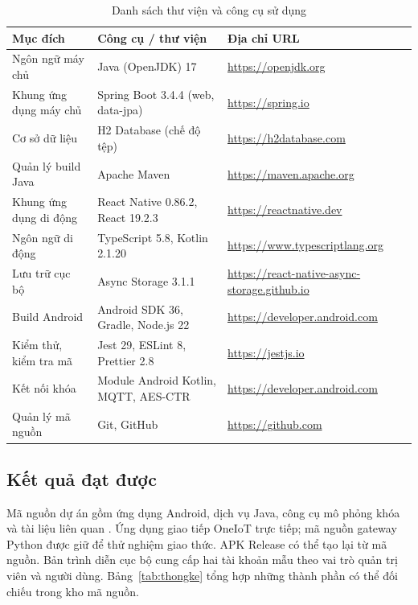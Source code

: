 \documentclass[../DoAn.tex]{subfiles}
\begin{document}
\begin{table}[H]
\centering\small
\renewcommand{\arraystretch}{1.1}
\caption{Danh sách thư viện và công cụ sử dụng}
\label{table:congcu}
\begin{tabularx}{\textwidth}{|p{4.3cm}|p{4.6cm}|X|}
\hline
\textbf{Mục đích} & \textbf{Công cụ / thư viện} & \textbf{Địa chỉ URL} \\ \hline
Ngôn ngữ máy chủ & Java (OpenJDK) 17 & \url{https://openjdk.org} \\ \hline
Khung ứng dụng máy chủ & Spring Boot 3.4.4 (web, data-jpa) & \url{https://spring.io} \\ \hline
Cơ sở dữ liệu & H2 Database (chế độ tệp) & \url{https://h2database.com} \\ \hline
Quản lý build Java & Apache Maven & \url{https://maven.apache.org} \\ \hline
Khung ứng dụng di động & React Native 0.86.2, React 19.2.3 & \url{https://reactnative.dev} \\ \hline
Ngôn ngữ di động & TypeScript 5.8, Kotlin 2.1.20 & \url{https://www.typescriptlang.org} \\ \hline
Lưu trữ cục bộ & Async Storage 3.1.1 & \url{https://react-native-async-storage.github.io} \\ \hline
Build Android & Android SDK 36, Gradle, Node.js 22 & \url{https://developer.android.com} \\ \hline
Kiểm thử, kiểm tra mã & Jest 29, ESLint 8, Prettier 2.8 & \url{https://jestjs.io} \\ \hline
Kết nối khóa & Module Android Kotlin, MQTT, AES-CTR & \url{https://developer.android.com} \\ \hline
Quản lý mã nguồn & Git, GitHub & \url{https://github.com} \\ \hline
\end{tabularx}
\end{table}

\subsection{Kết quả đạt được}
Mã nguồn dự án gồm ứng dụng Android, dịch vụ Java, công cụ mô phỏng khóa và tài liệu liên quan \cite{roomhubrepo}. Ứng dụng giao tiếp OneIoT trực tiếp; mã nguồn gateway Python được giữ để thử nghiệm giao thức. APK Release có thể tạo lại từ mã nguồn. Bản trình diễn cục bộ cung cấp hai tài khoản mẫu theo vai trò quản trị viên và người dùng. Bảng~\ref{tab:thongke} tổng hợp những thành phần có thể đối chiếu trong kho mã nguồn.
\end{document}
